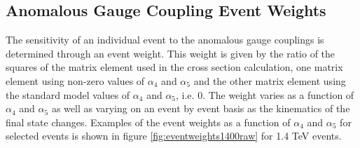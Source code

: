 \subsection{Anomalous Gauge Coupling Event Weights}
\label{sec:eventweights}
The sensitivity of an individual event to the anomalous gauge couplings is determined through an event weight. This weight is given by the ratio of the squares of the matrix element used in the cross section calculation, one matrix element using non-zero values of $\alpha_{4}$ and $\alpha_{5}$ and the other matrix element using the standard model values of $\alpha_{4}$ and $\alpha_{5}$, i.e. 0.  The weight varies as a function of $\alpha_{4}$ and $\alpha_{5}$ as well as varying on an event by event basis as the kinematics of the final state changes.  Examples of the event weights as a function of $\alpha_{4}$ and $\alpha_{5}$ for selected events is shown in figure \ref{fig:eventweights1400raw} for 1.4 TeV events.

